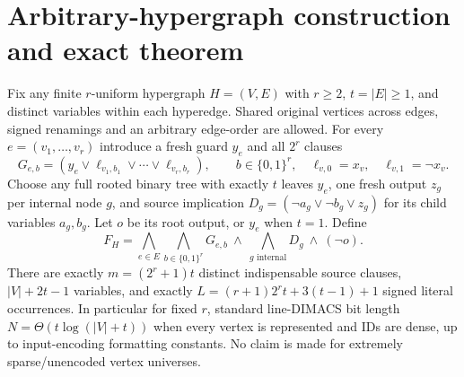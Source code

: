 \documentclass[11pt]{article}
\begin{document}
\section*{Arbitrary-hypergraph construction and exact theorem}
Fix any finite $r$-uniform hypergraph $H=(V,E)$ with $r\ge2$, $t=|E|\ge1$, and distinct variables within each hyperedge. Shared original vertices across edges, signed renamings and an arbitrary edge-order are allowed. For every $e=(v_1,\ldots,v_r)$ introduce a fresh guard $y_e$ and all $2^r$ clauses
\[
 G_{e,b}=(y_e\vee \ell_{v_1,b_1}\vee\cdots\vee\ell_{v_r,b_r}),
 \qquad b\in\{0,1\}^r,\quad
 \ell_{v,0}=x_v,\quad\ell_{v,1}=\neg x_v.
\]
Choose any full rooted binary tree with exactly $t$ leaves $y_e$, one fresh output $z_g$ per internal node $g$, and source implication $D_g=(\neg a_g\vee\neg b_g\vee z_g)$ for its child variables $a_g,b_g$. Let $o$ be its root output, or $y_e$ when $t=1$. Define
\[
 F_H=\bigwedge_{e\in E}\bigwedge_{b\in\{0,1\}^r}G_{e,b}
 \ \wedge\ \bigwedge_{g\text{ internal}}D_g\ \wedge\ (\neg o).
\]
There are exactly $m=(2^r+1)t$ distinct indispensable source clauses, $|V|+2t-1$ variables, and exactly $L=(r+1)2^r t+3(t-1)+1$ signed literal occurrences. In particular for fixed $r$, standard line-DIMACS bit length $N=\Theta(t\log(|V|+t))$ when every vertex is represented and IDs are dense, up to input-encoding formatting constants. No claim is made for extremely sparse/unencoded vertex universes.
\end{document}
